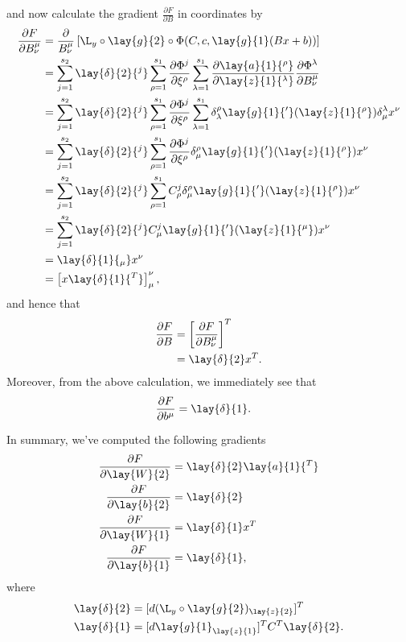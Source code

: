 and now calculate the gradient $\frac{\partial F}{\partial B}$ in coordinates by
\begin{align*}
	\frac{\partial F}{\partial B^\mu_\nu}&=\frac{\partial}{B^\mu_\nu}\left[\L_y\circ\lay{g}{2}\circ\Phi(C,c,\lay{g}{1}(Bx+b))\right]\\
	&=\sum_{j=1}^{s_2}\lay{\delta}{2}{^j}\sum_{\rho=1}^{s_1}\frac{\partial\Phi^j}{\partial \xi^\rho}\sum_{\lambda=1}^{s_1}\frac{\partial \lay{a}{1}{^\rho}}{\partial \lay{z}{1}{^\lambda}}\frac{\partial \Phi^\lambda}{\partial B^\mu_\nu}\\
	&=\sum_{j=1}^{s_2}\lay{\delta}{2}{^j}\sum_{\rho=1}^{s_1}\frac{\partial\Phi^j}{\partial \xi^\rho}\sum_{\lambda=1}^{s_1}
	\delta^\rho_\lambda \lay{g}{1}{'}(\lay{z}{1}{^\rho})
	\delta^{\lambda}_\mu x^\nu\\
	&=\sum_{j=1}^{s_2}\lay{\delta}{2}{^j}\sum_{\rho=1}^{s_1}\frac{\partial\Phi^j}{\partial \xi^\rho}\delta^\rho_\mu\lay{g}{1}{'}(\lay{z}{1}{^\rho})x^\nu\\
	&=\sum_{j=1}^{s_2}\lay{\delta}{2}{^j}\sum_{\rho=1}^{s_1}C^j_\rho\delta^\rho_\mu\lay{g}{1}{'}(\lay{z}{1}{^\rho})x^\nu\\
	&=\sum_{j=1}^{s_2}\lay{\delta}{2}{^j}C^j_\mu\lay{g}{1}{'}(\lay{z}{1}{^\mu})x^\nu\\
	&=\lay{\delta}{1}{_\mu}x^\nu\\
	&=\left[x\lay{\delta}{1}{^T}\right]^\nu_\mu,
\end{align*}
and hence that
\begin{align*}
	\frac{\partial F}{\partial B}&=\left[\frac{\partial F}{\partial B^\mu_\nu}\right]^T\\
	&=\lay{\delta}{2}x^T.
\end{align*}
Moreover, from the above calculation, we immediately see that
\begin{align*}
	\frac{\partial F}{\partial b^\mu}&=\lay{\delta}{1}.
\end{align*}

In summary, we've computed the following gradients
\begin{align*}
	\frac{\partial F}{\partial\lay{W}{2}}&=\lay{\delta}{2}\lay{a}{1}{^T}\\
	\frac{\partial F}{\partial\lay{b}{2}}&=\lay{\delta}{2}\\
	\frac{\partial F}{\partial\lay{W}{1}}&=\lay{\delta}{1}x^T\\
	\frac{\partial F}{\partial\lay{b}{1}}&=\lay{\delta}{1},
\end{align*}
where
\begin{align*}
	\lay{\delta}{2}&=[d(\L_y\circ\lay{g}{2})_{\lay{z}{2}}]^T\\
	\lay{\delta}{1}&=[d\lay{g}{1}_{\lay{z}{1}}]^TC^T\lay{\delta}{2}.
\end{align*}

